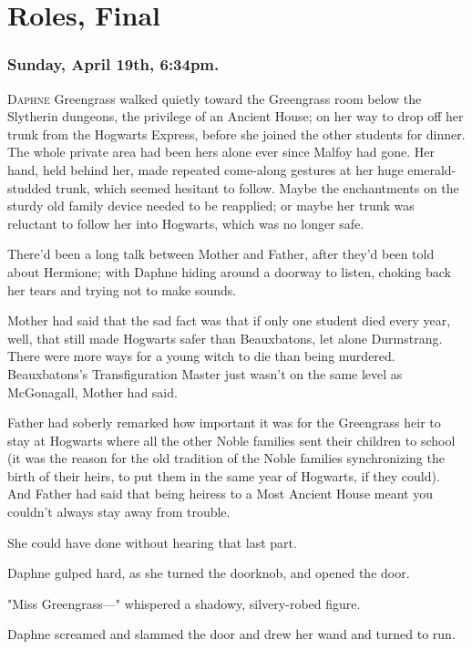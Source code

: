 \chapter{Roles, Final}

\subsection{Sunday, April 19th, 6:34pm.}

\lettrine{D}{aphne} Greengrass walked quietly toward the Greengrass room below the Slytherin 
dungeons, the privilege of an Ancient House; on her way to drop off her trunk 
from the Hogwarts Express, before she joined the other students for dinner. The 
whole private area had been hers alone ever since Malfoy had gone. Her hand, 
held behind her, made repeated come-along gestures at her huge emerald-studded 
trunk, which seemed hesitant to follow. Maybe the enchantments on the sturdy 
old family device needed to be reapplied; or maybe her trunk was reluctant to 
follow her into Hogwarts, which was no longer safe.

There'd been a long talk between Mother and Father, after they'd been told 
about Hermione; with Daphne hiding around a doorway to listen, choking back her 
tears and trying not to make sounds.

Mother had said that the sad fact was that if only one student died every year, 
well, that still made Hogwarts safer than Beauxbatons, let alone Durmstrang. 
There were more ways for a young witch to die than being murdered. 
Beauxbatons's Transfiguration Master just wasn't on the same level as 
McGonagall, Mother had said.

Father had soberly remarked how important it was for the Greengrass heir to 
stay at Hogwarts where all the other Noble families sent their children to 
school (it was the reason for the old tradition of the Noble families 
synchronizing the birth of their heirs, to put them in the same year of 
Hogwarts, if they could). And Father had said that being heiress to a Most 
Ancient House meant you couldn't always stay away from trouble.

She could have done without hearing that last part.

Daphne gulped hard, as she turned the doorknob, and opened the door.

"Miss Greengrass---" whispered a shadowy, silvery-robed figure.

Daphne screamed and slammed the door and drew her wand and turned to run.

